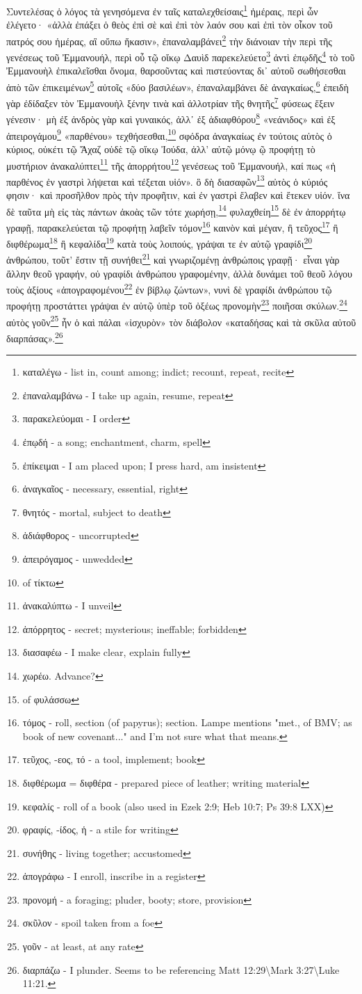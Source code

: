 Συντελέσας
ὁ
λόγος
τὰ
γενησόμενα
ἐν
ταῖς
καταλεχθείσαις\footnote{καταλέγω - list in, count among; indict; recount, repeat, recite}
ἡμέραις,
περὶ
ὧν
ἐλέγετο·
«ἀλλὰ
ἐπάξει
ὁ
θεὸς
ἐπὶ
σὲ
καὶ
ἐπὶ
τὸν
λαόν
σου
καὶ
ἐπὶ
τὸν
οἶκον
τοῦ
πατρός
σου
ἡμέρας,
αἳ
οὔπω
ἥκασιν»,
ἐπαναλαμβάνει\footnote{ἐπαναλαμβάνω - I take up again, resume, repeat}
τὴν
διάνοιαν
τὴν
περὶ
τῆς
γενέσεως
τοῦ
Ἐμμανουήλ,
περὶ
οὗ
τῷ
οἴκῳ
Δαυὶδ
παρεκελεύετο\footnote{παρακελεύομαι - I order}
ἀντὶ
ἐπῳδῆς\footnote{ἐπῳδή - a song; enchantment, charm, spell}
τὸ
τοῦ
Ἐμμανουὴλ
ἐπικαλεῖσθαι
ὄνομα,
θαρσοῦντας
καὶ
πιστεύοντας
δι᾽
αὐτοῦ
σωθήσεσθαι
ἀπὸ
τῶν
ἐπικειμένων\footnote{ἐπίκειμαι - I am placed upon; I press hard, am insistent}
αὐτοῖς
«δύο
βασιλέων»,
ἐπαναλαμβάνει
δὲ
ἀναγκαίως,\footnote{ἀναγκαῖος - necessary, essential, right}
ἐπειδὴ
γὰρ
ἐδίδαξεν
τὸν
Ἐμμανουὴλ
ξένην
τινὰ
καὶ
ἀλλοτρίαν
τῆς
θνητῆς\footnote{θνητός - mortal, subject to death}
φύσεως
ἕξειν
γένεσιν·
μὴ
ἐξ
ἀνδρὸς
γὰρ
καὶ
γυναικός,
ἀλλ᾽
ἐξ
ἀδιαφθόρου\footnote{ἀδιάφθορος - uncorrupted}
«νεάνιδος»
καὶ
ἐξ
ἀπειρογάμου\footnote{ἀπειρόγαμος - unwedded}
«παρθένου»
τεχθήσεσθαι,\footnote{ of τίκτω}
σφόδρα
ἀναγκαίως
ἐν
τούτοις
αὐτὸς
ὁ
κύριος,
οὐκέτι
τῷ
Ἄχαζ
οὐδὲ
τῷ
οἴκῳ
Ἰούδα,
ἀλλ'
αὐτῷ
μόνῳ 
ῷ
προφήτῃ
τὸ
μυστήριον
ἀνακαλύπτει\footnote{ἀνακαλύπτω - I unveil}
τῆς
ἀπορρήτου\footnote{ἀπόρρητος - secret; mysterious; ineffable; forbidden}
γενέσεως
τοῦ
Ἐμμανουήλ,
καί
πως
«ἡ
παρθένος
ἐν
γαστρὶ
λήψεται
καὶ
τέξεται
υἱόν».
ὃ
δὴ
διασαφῶν\footnote{διασαφέω - I make clear, explain fully}
αὐτὸς
ὁ
κύριός
φησιν·
καὶ
προσῆλθον
πρὸς
τὴν
προφῆτιν,
καὶ
ἐν
γαστρὶ
ἔλαβεν
καὶ
ἔτεκεν
υἱόν.
ἵνα
δὲ
ταῦτα
μὴ
εἰς
τὰς
πάντων
ἀκοὰς
τῶν
τότε
χωρήσῃ,\footnote{χωρέω. Advance?}
φυλαχθείη\footnote{ of φυλάσσω}
δὲ
ἐν
ἀπορρήτῳ
γραφῇ,
παρακελεύεται
τῷ
προφήτῃ
λαβεῖν
τόμον\footnote{τόμος - roll, section (of papyrus); section. Lampe mentions "met., of BMV; as book of new covenant..." and I'm not sure what that means.}
καινὸν
καὶ
μέγαν,
ἢ
τεῦχος\footnote{τεῦχος, -εος, τό - a tool, implement; book}
ἢ
διφθέρωμα\footnote{διφθέρωμα = διφθέρα - prepared piece of leather; writing material}
ἢ
κεφαλίδα\footnote{κεφαλίς - roll of a book (also used in Ezek 2:9; Heb 10:7; Ps 39:8 LXX)}
κατὰ
τοὺς
λοιπούς,
γράψαι
τε
ἐν
αὐτῷ
γραφίδι\footnote{φραφίς, -ίδος, ἡ - a stile for writing}
ἀνθρώπου,
τοῦτ'
ἔστιν
τῇ
συνήθει\footnote{συνήθης - living together; accustomed}
καὶ
γνωριζομένῃ
ἀνθρώποις
γραφῇ·
εἶναι
γὰρ
ἄλλην
θεοῦ
γραφήν,
οὐ
γραφίδι
ἀνθρώπου
γραφομένην,
ἀλλὰ
δυνάμει
τοῦ
θεοῦ
λόγου
τοὺς
ἀξίους
«ἀπογραφομένου\footnote{ἀπογράφω - I enroll, inscribe in a register}
ἐν
βίβλῳ
ζώντων»,
νυνὶ
δὲ
γραφίδι
ἀνθρώπου
τῷ
προφήτῃ
προστάττει
γράψαι
ἐν
αὐτῷ
ὑπὲρ
τοῦ
ὀξέως
προνομὴν\footnote{προνομή - a foraging; pluder, booty; store, provision}
ποιῆσαι
σκύλων.\footnote{σκῦλον - spoil taken from a foe}
αὐτὸς
γοῦν\footnote{γοῦν - at least, at any rate}
ἦν
ὁ
καὶ
πάλαι
«ἰσχυρὸν»
τὸν
διάβολον
«καταδήσας
καὶ
τὰ
σκῦλα
αὐτοῦ
διαρπάσας».\footnote{διαρπάζω - I plunder. Seems to be referencing Matt 12:29\textbackslash Mark 3:27\textbackslash Luke 11:21.}







